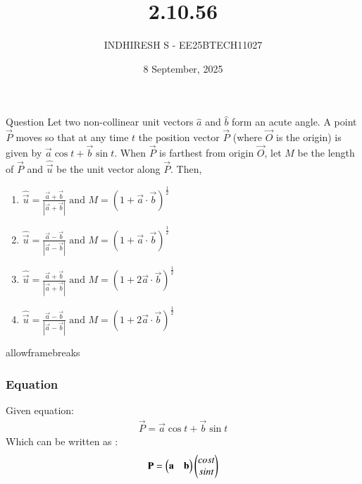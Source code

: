 \documentclass{beamer}
\title %
{2.10.56}
\date{8 September, 2025}
\author %
{INDHIRESH S - EE25BTECH11027}
\begin{document}
\frame{\titlepage}
\begin{frame}{Question}
Let two non-collinear unit vectors $\hat{a}$ and $\hat{b}$ form an acute angle. A point $\vec{P}$ moves so that at any time $t$ the position vector $\Vec{P}$ (where $\vec{O}$ is the origin) is given by $\Vec{a}\cos{t} + \vec{b}\sin{t}$. When $\vec{P}$ is farthest from origin $\vec{O}$, let $M$ be the length of $\Vec{P}$ and $\hat{\vec{u}}$ be the unit vector along $\Vec{P}$. Then,

    \begin{enumerate}
	    \item $\hat{\vec{u}} = \frac{\Vec{a}+\vec{b}}{|\Vec{a}+\vec{b}|} \text{ and } M = (1+\Vec{a} \cdot \vec{b})^{\frac{1}{2}}$
    	\item $\hat{\vec{u}} = \frac{\Vec{a}-\vec{b}}{|\Vec{a}-\vec{b}|} \text{ and } M = (1+\Vec{a} \cdot \vec{b})^{\frac{1}{2}}$
    	\item $\hat{\vec{u}} = \frac{\Vec{a}+\vec{b}}{|\Vec{a}+\vec{b}|} \text{ and } M = (1+2\Vec{a} \cdot \vec{b})^{\frac{1}{2}}$
    	\item $\hat{\vec{u}} = \frac{\Vec{a}-\vec{b}}{|\Vec{a}-\vec{b}|} \text{ and } M = (1+2\Vec{a} \cdot \vec{b})^{\frac{1}{2}}$
    \end{enumerate}
    
\end{frame}
\begin{frame}{allowframebreaks}
\frametitle{Equation}

    \centering
    
    \label{tab:parameters}
Given equation:
\begin{align}
     \Vec{P}=\vec{a}\cos{t} + \vec{b}\sin{t}
\end{align}
Which can be written as :
\begin{align}
    \Vec{P}=\myvec{\vec{a}&\vec{b}}\myvec{cost\\sint}
\end{align}

   
\end{frame}
\end{document}

